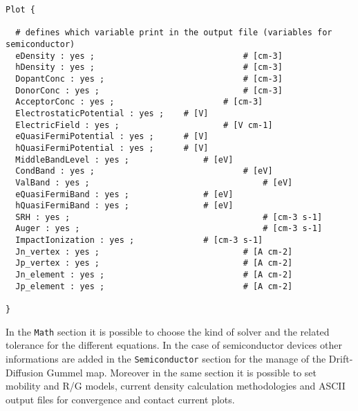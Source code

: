\begin{lstlisting}[style = general]
Plot {

  # defines which variable print in the output file (variables for semiconductor)
  eDensity : yes ;  							# [cm-3]
  hDensity : yes ; 								# [cm-3]
  DopantConc : yes ; 							# [cm-3]
  DonorConc : yes ; 							# [cm-3]
  AcceptorConc : yes ; 						# [cm-3]
  ElectrostaticPotential : yes ; 	# [V]
  ElectricField : yes ; 					# [V cm-1]
  eQuasiFermiPotential : yes ; 		# [V]
  hQuasiFermiPotential : yes ; 		# [V]
  MiddleBandLevel : yes ; 				# [eV]
  CondBand : yes ; 								# [eV]
  ValBand : yes ;									# [eV]
  eQuasiFermiBand : yes ; 				# [eV]
  hQuasiFermiBand : yes ; 				# [eV]
  SRH : yes ; 										# [cm-3 s-1]
  Auger : yes ; 									# [cm-3 s-1]
  ImpactIonization : yes ; 				# [cm-3 s-1]
  Jn_vertex : yes ; 							# [A cm-2]
  Jp_vertex : yes ; 							# [A cm-2]
  Jn_element : yes ; 							# [A cm-2]
  Jp_element : yes ; 							# [A cm-2]
  
}
\end{lstlisting}

\vspace{0.5cm}
In the \texttt{Math} section it is possible to choose the kind of solver and the related tolerance for the different equations. In the case of semiconductor devices other informations are added in the \texttt{Semiconductor} section for the manage of the Drift-Diffusion Gummel map. Moreover in the same section it is possible to set mobility and R/G models, current density calculation methodologies and ASCII output files for convergence and contact current plots.
\vspace{0.5cm}

